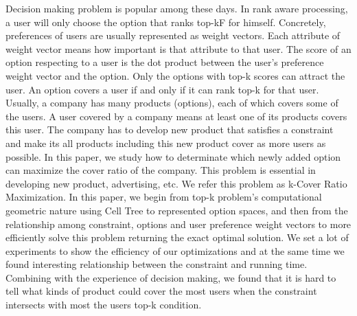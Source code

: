 
\begin{enabstract}
    Decision making problem is popular among these days. In rank aware processing, 
    a user will only choose the option that ranks top-kF for himself. 
    Concretely, preferences of users are usually represented as weight vectors. 
    Each attribute of weight vector means how important is that attribute to that user. 
    The score of an option respecting to a user is the dot product between the user's 
    preference weight vector and the option. Only the options with top-k scores can 
    attract the user. An option covers a user if and only if it can rank top-k for 
    that user. Usually, a company has many products (options), each of which covers 
    some of the users. A user covered by a company means at least one of its products 
    covers this user. The company has to develop new product that satisfies a constraint 
    and make its all products including this new product cover as more users as possible. 
    In this paper, we study how to determinate which newly added option can maximize 
    the cover ratio of the company. This problem is essential in developing new product, 
    advertising, etc. We refer this problem as k-Cover Ratio Maximization. 
    In this paper, we begin from top-k problem's computational geometric nature using 
    Cell Tree to represented option spaces, and then from the relationship among constraint, 
    options and user preference weight vectors to more efficiently solve this problem 
    returning the exact optimal solution. We set a lot of experiments to show the efficiency
    of our optimizations and at the same time we found interesting relationship 
    between the constraint and running time. Combining with the experience of decision 
    making, we found that it is hard to tell what kinds of product could cover the most
    users when the constraint intersects with most the users top-k condition.

\end{enabstract}


